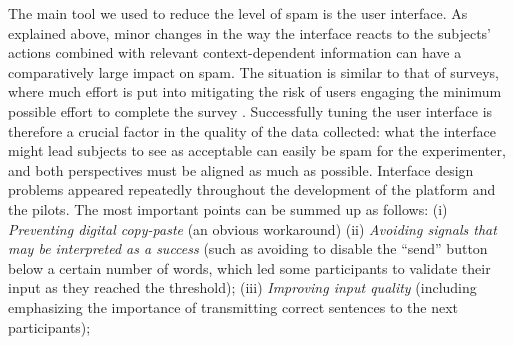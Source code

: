 \documentclass[a4paper,fleqn]{cas-dc}
\begin{document}
The main tool we used to reduce the level of spam is the user interface.
As explained above, minor changes in the way the interface reacts to the
subjects' actions combined with relevant context-dependent information
can have a comparatively large impact on spam.
The situation is similar to that of surveys, where much effort is put
into mitigating the risk of users engaging the minimum possible effort
to complete the survey \citep{krosnick_threat_2000}. Successfully
tuning the user interface is therefore a crucial factor in the quality
of the data collected: what the interface might lead subjects to see as
acceptable can easily be spam for the experimenter, and both
perspectives must be aligned as much as possible. Interface design
problems appeared repeatedly throughout the development of the platform
and the pilots. The most important points can be summed up as follows:
(i)
  \emph{Preventing digital copy-paste} (an obvious workaround)
(ii)
  \emph{Avoiding signals that may be interpreted as a success} (such as avoiding to disable the ``send'' button below a certain number of words, which led some participants to validate their input as they reached the threshold);
(iii)
  \emph{Improving input quality} (including emphasizing the importance of transmitting correct sentences to the next participants);
\end{document}
